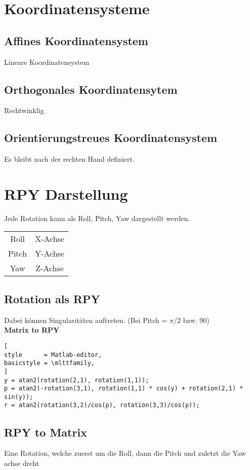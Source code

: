 \section{Koordinatensysteme}
\label{chp:MathematischeGrundlagen:sec:Koordinatensysteme}

\subsection{Affines Koordinatensystem}
Lineare Koordinatensystem

\subsection{Orthogonales Koordinatensytem}
Rechtwinklig

\subsection{Orientierungstreues Koordinatensystem}
Es bleibt nach der rechten Hand definiert.

\section{RPY Darstellung}
\label{chp:MathematischeGrundlagen:sec:RPY}
Jede Rotation kann als Roll, Pitch, Yaw dargestellt werden.

\begin{tabular}{cc}
	Roll & X-Achse \\
	Pitch & Y-Achse \\
	Yaw & Z-Achse
\end{tabular}


\subsection{Rotation als RPY}
Dabei können Singularitäten auftreten. (Bei Pitch = $\pi/2 $ bzw. 90\textdegree) \\
	\textbf{Matrix to RPY}
\begin{lstlisting}[
style      = Matlab-editor,
basicstyle = \mlttfamily,
]
y = atan2(rotation(2,1), rotation(1,1));
p = atan2(-rotation(3,1), rotation(1,1) * cos(y) + rotation(2,1) * sin(y));
r = atan2(rotation(3,2)/cos(p), rotation(3,3)/cos(p));
\end{lstlisting} 

\subsection{RPY to Matrix}
Eine Rotation, welche zuerst um die Roll, dann die Pitch und zuletzt die Yaw achse dreht

